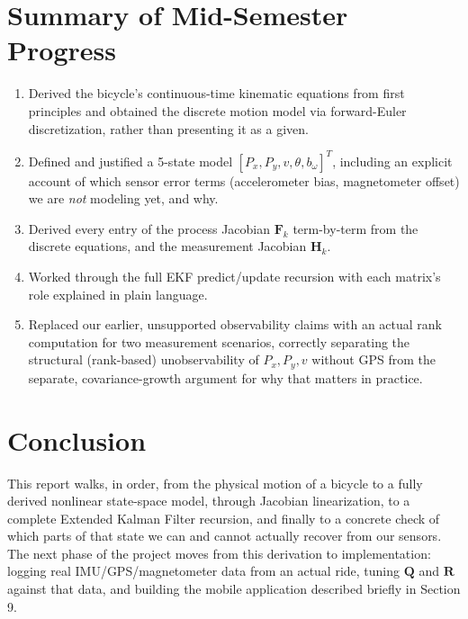 \documentclass[11pt,a4paper]{article}
\begin{document}
\section{Summary of Mid-Semester Progress}

\begin{enumerate}
    \item Derived the bicycle's continuous-time kinematic equations from first principles and obtained the discrete motion model via forward-Euler discretization, rather than presenting it as a given.
    \item Defined and justified a 5-state model $[P_x, P_y, v, \theta, b_\omega]^T$, including an explicit account of which sensor error terms (accelerometer bias, magnetometer offset) we are \emph{not} modeling yet, and why.
    \item Derived every entry of the process Jacobian $\mathbf{F}_k$ term-by-term from the discrete equations, and the measurement Jacobian $\mathbf{H}_k$.
    \item Worked through the full EKF predict/update recursion with each matrix's role explained in plain language.
    \item Replaced our earlier, unsupported observability claims with an actual rank computation for two measurement scenarios, correctly separating the structural (rank-based) unobservability of $P_x,P_y,v$ without GPS from the separate, covariance-growth argument for why that matters in practice.
\end{enumerate}

\section{Conclusion}

This report walks, in order, from the physical motion of a bicycle to a fully derived nonlinear state-space model, through Jacobian linearization, to a complete Extended Kalman Filter recursion, and finally to a concrete check of which parts of that state we can and cannot actually recover from our sensors. The next phase of the project moves from this derivation to implementation: logging real IMU/GPS/magnetometer data from an actual ride, tuning $\mathbf{Q}$ and $\mathbf{R}$ against that data, and building the mobile application described briefly in Section 9.
\end{document}
